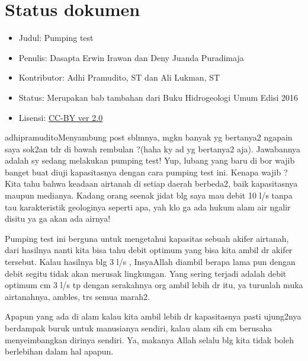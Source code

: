 \section{Status dokumen}

\begin{itemize}
\item Judul: Pumping test
\end{itemize}
\begin{itemize}
\item Penulis: Dasapta Erwin Irawan dan Deny Juanda Puradimaja
\end{itemize}
\begin{itemize}
\item Kontributor: Adhi Pramudito, ST dan Ali Lukman, ST
\end{itemize}
\begin{itemize}
\item Status: Merupakan bab tambahan dari Buku Hidrogeologi Umum Edisi 2016
\end{itemize}
\begin{itemize}
\item Lisensi: \href{http://creativecommons.org/licenses/by/2.0/}{CC-BY ver 2.0}
\end{itemize}

adhipramuditoMenyambung post sblmnya, mgkn banyak yg bertanya2 ngapain saya sok2an tdr di bawah rembulan ?(haha ky ad yg bertanya2 aja). Jawabannya adalah sy sedang melakukan pumping test! 
Yup, lubang yang baru di bor wajib banget buat diuji kapasitasnya dengan cara pumping test ini. Kenapa wajib ? Kita tahu bahwa keadaan airtanah di setiap daerah berbeda2, baik kapasitasnya maupun medianya. Kadang orang seenak jidat blg saya mau debit 10 l/s tanpa tau karakteristik geologinya seperti apa, yah klo ga ada hukum alam air ngalir disitu ya ga akan ada airnya!

Pumping test ini berguna untuk mengetahui kapasitas sebuah akifer airtanah, dari hasilnya nanti kita bisa tahu debit optimum yang bisa kita ambil dr akifer tersebut. Kalau hasilnya blg 3 l/s , InsyaAllah diambil berapa lama pun dengan debit segitu tidak akan merusak lingkungan. Yang sering terjadi adalah debit optimum cm 3 l/s tp dengan serakahnya org ambil lebih dr itu, ya turunlah muka airtanahnya, ambles, trs semua marah2.

Apapun yang ada di alam kalau kita ambil lebih dr kapasitasnya pasti ujung2nya berdampak buruk untuk manusianya sendiri, kalau alam sih cm berusaha menyeimbangkan dirinya sendiri. Ya, makanya Allah selalu blg kita tidak boleh berlebihan dalam hal apapun.

